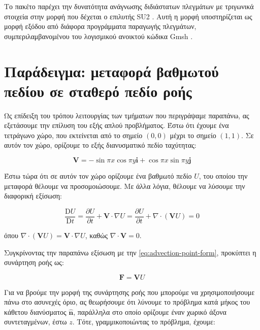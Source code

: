Το πακέτο παρέχει την δυνατότητα ανάγνωσης διδιάστατων πλεγμάτων με τριγωνικά στοιχεία στην μορφή που δέχεται ο επιλυτής SU2 \cite{Palacios2013}.
Αυτή η μορφή υποστηρίζεται ως μορφή εξόδου από διάφορα προγράμματα παραγωγής πλεγμάτων, συμπεριλαμβανομένου του λογισμικού ανοικτού κώδικα Gmsh \cite{Gmsh2009}.

\section{Παράδειγμα: μεταφορά βαθμωτού πεδίου σε σταθερό πεδίο ροής}
\label{section:square-advection}

Ως επίδειξη του τρόπου λειτουργίας των τμήματων που περιγράψαμε παραπάνω, ας εξετάσουμε την επίλυση του εξής απλού προβλήματος.
Έστω ότι έχουμε ένα τετράγωνο χώρο, που εκτείνεται από το σημείο $\left(0, 0\right)$ μέχρι το σημείο $\left(1, 1\right)$.
Σε αυτόν τον χώρο, ορίζουμε το εξής διανυσματικό πεδίο ταχύτητας:

\begin{equation*}
    \mathbf{V} = - \sin \pi x \cos \pi y \mathbf{i} + \cos \pi x \sin \pi y \mathbf{j}
\end{equation*}


Έστω τώρα ότι σε αυτόν τον χώρο ορίζουμε ένα βαθμωτό πεδίο $U$, του οποίου την μεταφορά θέλουμε να προσομοιώσουμε.
Με άλλα λόγια, θέλουμε να λύσουμε την διαφορική εξίσωση:

\begin{equation*}
    \frac{\mathrm{D} U}{\mathrm{D} t} = \frac{\partial U}{\partial t} + \mathbf{V} \cdot \nabla U =
        \frac{\partial U}{\partial t} + \nabla \cdot \left( \mathbf{V} U \right) = 0
\end{equation*}

όπου $\nabla \cdot \left( \mathbf{V} U \right) = \mathbf{V} \cdot \nabla U$, καθώς $\nabla \cdot \mathbf{V} = 0$.

Συγκρίνοντας την παραπάνω εξίσωση με την \ref{eq:advection-point-form}, προκύπτει η συνάρτηση ροής ως:

\begin{equation*}
    \mathbf{F} = \mathbf{V} U
\end{equation*}

Για να βρούμε την μορφή της συνάρτησης ροής που μπορούμε να χρησιμοποιήσουμε πάνω στο ασυνεχές όριο, ας θεωρήσουμε ότι λύνουμε το πρόβλημα κατά μήκος του κάθετου διανύσματος $\mathbf{\hat{n}}$, παράλληλα στο οποίο ορίζουμε έναν χωρικό άξονα συντεταγμένων, έστω $z$.
Τότε, γραμμικοποιώντας το πρόβλημα, έχουμε:

